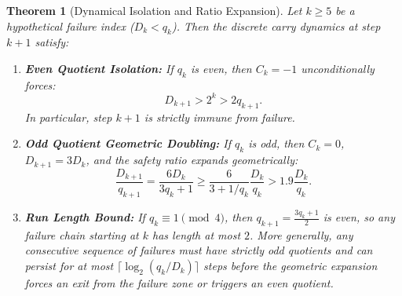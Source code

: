 \documentclass[11pt,reqno]{amsart}
\newtheorem{theorem}{Theorem}[section]
\theoremstyle{definition}
\numberwithin{equation}{section}
\begin{document}
\begin{theorem}[Dynamical Isolation and Ratio Expansion]\label{thm:repulsion}
Let $k \ge 5$ be a hypothetical failure index ($D_k < q_k$). Then the discrete carry dynamics at step $k+1$ satisfy:
\begin{enumerate}
    \item \textbf{Even Quotient Isolation:} If $q_k$ is even, then $C_k = -1$ unconditionally forces:
    \begin{equation}\label{eq:even_isolation}
    D_{k+1} > 2^k > 2 q_{k+1}.
    \end{equation}
    In particular, step $k+1$ is strictly immune from failure.
    \item \textbf{Odd Quotient Geometric Doubling:} If $q_k$ is odd, then $C_k = 0$, $D_{k+1} = 3 D_k$, and the safety ratio expands geometrically:
    \begin{equation}\label{eq:ratio_doubling}
    \frac{D_{k+1}}{q_{k+1}} = \frac{6 D_k}{3 q_k + 1} \ge \frac{6}{3 + 1/q_k} \frac{D_k}{q_k} > 1.9 \frac{D_k}{q_k}.
    \end{equation}
    \item \textbf{Run Length Bound:} If $q_k \equiv 1 \pmod 4$, then $q_{k+1} = \frac{3 q_k + 1}{2}$ is even, so any failure chain starting at $k$ has length at most $2$. More generally, any consecutive sequence of failures must have strictly odd quotients and can persist for at most $\lceil \log_2(q_k / D_k) \rceil$ steps before the geometric expansion forces an exit from the failure zone or triggers an even quotient.
\end{enumerate}
\end{theorem}
\end{document}

